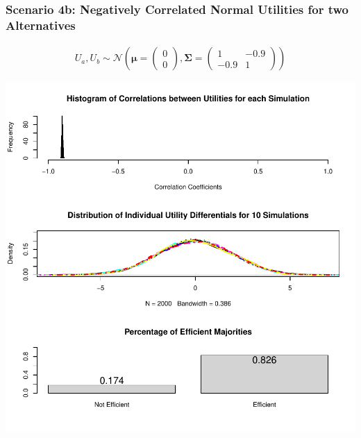 \documentclass[12pt]{article}\usepackage[]{graphicx}\usepackage[]{color}
\makeatletter
\def\maxwidth{ %
  \ifdim\Gin@nat@width>\linewidth
    \linewidth
  \else
    \Gin@nat@width
  \fi
}
\newenvironment{knitrout}{}{} %
\makeatother
\begin{document}
\clearpage
\subsubsection*{Scenario 4b: Negatively Correlated Normal Utilities for two Alternatives}
\begin{align*}
U_a,U_b \sim \mathcal{N}\left(
\boldsymbol{\mu}=\begin{pmatrix}0 \\ 0\end{pmatrix},
\mathbf{\Sigma}=\begin{pmatrix}1 & -0.9 \\ -0.9 & 1\end{pmatrix}\right)
\end{align*}

\begin{knitrout}
\color{fgcolor}
\includegraphics[width=\maxwidth]{figure/unnamed-chunk-91} 


\end{knitrout}
\end{document}
